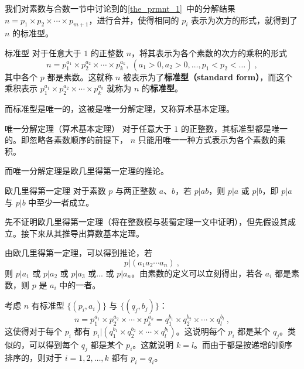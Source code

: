 
我们对素数与合数一节中讨论到的\autoref{the_prmnt_1}~中的分解结果 $n = p_1 \times p_2\times \cdots \times p_{m+1}$，进行合并，使得相同的 $p_i$ 表示为次方的形式，就得到了 $n$ 的标准型。
\begin{definition}{标准型}
对于任意大于 $1$ 的正整数 $n$，将其表示为各个素数的次方的乘积的形式
\begin{equation}
n = p_1^{a_1} \times p_2^{a_2} \times \cdots \times p_k^{a_k}, ~ (a_1 > 0, a_2 > 0 , \dots, p_1 < p_2<\dots) ~,
\end{equation}
其中各个 $p$ 都是素数。这就称 $n$ 被表示为了\textbf{标准型（standard form）}，而这个乘积表示 $p_1^{a_1} \times p_2^{a_2} \times \cdots \times p_k^{a_k}$ 就称为 $n$ 的\textbf{标准型}。
\end{definition}

而标准型是唯一的，这被是唯一分解定理，又称算术基本定理。
\begin{theorem}{唯一分解定理（算术基本定理）}
对于任意大于 $1$ 的正整数，其标准型都是唯一的。即忽略各素数顺序的前提下， $n$ 只能用唯一一种方式表示为各个素数的乘积。
\end{theorem}

而唯一分解定理是欧几里得第一定理的推论。
\begin{theorem}{欧几里得第一定理}\label{the_stafnt_1}
对于素数 $p$ 与两正整数 $a$、$b$，若 $p|ab$，则 $p|a$ 或 $p|b$，即 $p|a$ 与 $p|b$ 中至少一者成立。
\end{theorem}

先不证明欧几里得第一定理（将在整数模与裴蜀定理一文中证明），但先假设其成立。接下来从其推导出算数基本定理。

由欧几里得第一定理，可以得到推论，若
\begin{equation}
p | (a_1 a_2 \cdots a_n) ~,
\end{equation}
则 $p | a_1$ 或 $p | a_2$ 或 $p|a_3$ 或... 或 $p|a_n$。由素数的定义可以立刻得出，若各 $a_i$ 都是素数，则 $p$ 是 $a_i$ 中的一者。

考虑 $n$ 有标准型 $\{(p_i, a_i)\}$ 与  $\{(q_j, b_j)\}$：
\begin{equation}
n = p_1^{a_1}\times p_2^{a_2} \times \cdots \times p_k^{a_k} = q_1^{b_1} \times q_2^{b_2} \times \cdots \times q_l^{b_l} ~,
\end{equation}
这使得对于每个 $p_i$ 都有 $p_i | (q_1^{b_1} \times q_2^{b_2} \times \cdots \times q_l^{b_l})$。这说明每个 $p_i$ 都是某个 $q_j$。类似的，可以得到每个 $q_j$ 都是某个 $p_i$。这就说明 $k = l$。而由于都是按递增的顺序排序的，则对于 $i = 1,2,\dots, k$ 都有 $p_i = q_i$。

